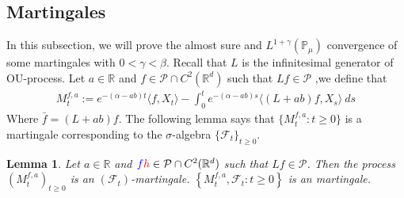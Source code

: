 \documentclass[12pt,oneside,english]{amsart}
\theoremstyle{plain}
\newtheorem{lem}[thm]{Lemma}
\theoremstyle{definition}
\numberwithin{equation}{section}
\newcommand{\added}[1]{{\color{blue}#1}}\newcommand{\deleted}[1]{{\color{red}#1}}
\begin{document}
\subsection{Martingales}
    In this subsection, we will prove the almost sure and $L^{1+\gamma}(\mathbb{P}_{\mu})$ convergence of some martingales with $0<\gamma<\beta$. Recall that $L$ is the infinitesimal generator of OU-process. Let $a\in \mathbb{R}$ and $f\in \mathcal{P}\cap C^2(\mathbb{R}^d)$ such that $Lf \in \mathcal{P}$ ,we define that
\begin{align}
\label{defmartingale}
    M_t^{f,a}:=e^{-(\alpha-ab)t}\langle f,X_t\rangle-\int_0^t e^{-(\alpha-ab)s}\langle (L+ab)f, X_s\rangle~ ds
\end{align}
    \deleted{Where $\bar{f}=(L+ab)f$.} 
    The following lemma says that $\{M_t^{f,a}: t\geq 0\}$ is a martingale corresponding to the $\sigma$-algebra $\{\mathcal{F}_t\}_{t\geq 0}$.
\begin{lem}
\label{lemma25}
    Let $a\in \mathbb R$ and $\added{f} \deleted{h}\in \mathcal{P}\cap C^2(\mathbb{R}^d)$ such that $Lf \in \mathcal{P}$. Then the process \added{$(M_t^{f,a})_{t\geq 0}$ is an $(\mathscr F_t)$-martingale.} \deleted{$\left\{M_t^{f,a}, \mathcal{F}_t:t\geq 0\right\}$ is an martingale.}
\end{lem}
\end{document}
